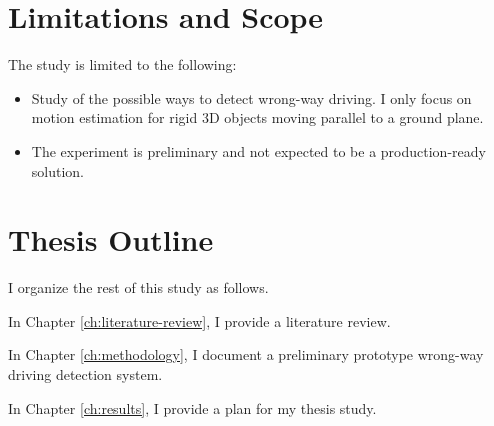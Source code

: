 \section{Limitations and Scope}
The study is limited to the following:
\begin{itemize}
  \item Study of the possible ways to detect wrong-way driving. I only focus on motion estimation for rigid 3D objects moving parallel to a ground plane.
  \item The experiment is preliminary and not expected to be a production-ready solution.
\end{itemize}


\section{Thesis Outline}

I organize the rest of this study as follows.

In Chapter \ref{ch:literature-review}, I provide a literature review.

In Chapter \ref{ch:methodology}, I document a preliminary prototype wrong-way driving detection system.

In Chapter \ref{ch:results}, I provide a plan for my thesis study.



\FloatBarrier
